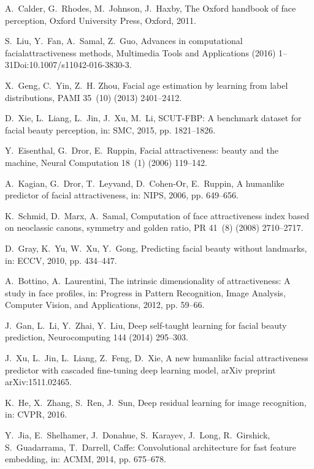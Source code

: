 \documentclass[preprint,5p,times,twocolumn]{elsarticle}
\begin{document}
\begin{thebibliography}{}

A.~Calder, G.~Rhodes, M.~Johnson, J.~Haxby, The Oxford handbook of face
  perception, Oxford University Press, Oxford, 2011.

S.~Liu, Y.~Fan, A.~Samal, Z.~Guo, Advances in computational
  facialattractiveness methods, Multimedia Tools and Applications (2016)
  1--31Doi:10.1007/s11042-016-3830-3.

X.~Geng, C.~Yin, Z.~H. Zhou, Facial age estimation by learning from label
  distributions, PAMI 35~(10) (2013) 2401--2412.

D.~Xie, L.~Liang, L.~Jin, J.~Xu, M.~Li, \textsc{SCUT-FBP}: A benchmark dataset
  for facial beauty perception, in: SMC, 2015, pp. 1821--1826.

Y.~Eisenthal, G.~Dror, E.~Ruppin, Facial attractiveness: beauty and the
  machine, Neural Computation 18~(1) (2006) 119--142.

A.~Kagian, G.~Dror, T.~Leyvand, D.~Cohen-Or, E.~Ruppin, A humanlike predictor
  of facial attractiveness, in: NIPS, 2006, pp. 649--656.

K.~Schmid, D.~Marx, A.~Samal, Computation of face attractiveness index based on
  neoclassic canons, symmetry and golden ratio, PR 41~(8) (2008) 2710--2717.

D.~Gray, K.~Yu, W.~Xu, Y.~Gong, Predicting facial beauty without landmarks, in:
  ECCV, 2010, pp. 434--447.

A.~Bottino, A.~Laurentini, The intrinsic dimensionality of attractiveness: A
  study in face profiles, in: Progress in Pattern Recognition, Image Analysis,
  Computer Vision, and Applications, 2012, pp. 59--66.

J.~Gan, L.~Li, Y.~Zhai, Y.~Liu, Deep self-taught learning for facial beauty
  prediction, Neurocomputing 144 (2014) 295--303.

J.~Xu, L.~Jin, L.~Liang, Z.~Feng, D.~Xie, A new humanlike facial attractiveness
  predictor with cascaded fine-tuning deep learning model, arXiv preprint
  arXiv:1511.02465.

K.~He, X.~Zhang, S.~Ren, J.~Sun, Deep residual learning for image recognition,
  in: CVPR, 2016.

Y.~Jia, E.~Shelhamer, J.~Donahue, S.~Karayev, J.~Long, R.~Girshick,
  S.~Guadarrama, T.~Darrell, Caffe: Convolutional architecture for fast feature
  embedding, in: ACMM, 2014, pp. 675--678.


\end{thebibliography}
\end{document}
